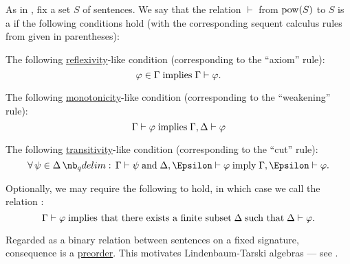 \begin{definition}\label{def:consequence_relation}
  As in , fix a set \( S \) of sentences. We say that the relation \( \vdash \) from \( \operatorname{pow}(S) \) to \( S \) is a  if the following conditions hold (with the corresponding sequent calculus rules from \cite[29]{TroelstraSchwichtenberg2000} given in parentheses):
  \begin{thmenum}
     The following \hyperref[def:binary_relation/reflexive]{reflexivity}-like condition (corresponding to the \enquote{axiom} rule):
    \begin{equation}\label{eq:def:consequence_relation/reflexivity}
      \varphi \in \Gamma \T{implies} \Gamma \vdash \varphi.
    \end{equation}

     The following \hyperref[def:order_function/preserving]{monotonicity}-like condition (corresponding to the \enquote{weakening} rule):
    \begin{equation}\label{eq:def:consequence_relation/monotonicity}
      \Gamma \vdash \varphi \T{implies} \Gamma, \Delta \vdash \varphi
    \end{equation}

     The following \hyperref[def:binary_relation/transitive]{transitivity}-like condition (corresponding to the \enquote{cut} rule):
    \begin{equation}\label{eq:def:consequence_relation/transitivity}
      \quantifier \forall {\psi \in \Delta} \Gamma \vdash \psi \T{and} \Delta, \Epsilon \vdash \varphi \T{imply} \Gamma, \Epsilon \vdash \varphi.
    \end{equation}

     Optionally, we may require the following to hold, in which case we call the relation :
    \begin{equation}\label{eq:def:consequence_relation/compactness}
      \Gamma \vdash \varphi \T{implies that there exists a finite subset} \Delta \T{such that} \Delta \vdash \varphi.
    \end{equation}
  \end{thmenum}
\end{definition}
\begin{comments}
  \item Regarded as a binary relation between sentences on a fixed signature, consequence is a \hyperref[def:preordered_set]{preorder}. This motivates Lindenbaum-Tarski algebras --- see .
\end{comments}

